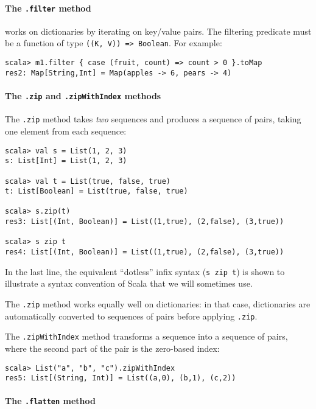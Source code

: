 \paragraph*{The \lstinline!.filter! method }

works on dictionaries by iterating on key/value pairs. The filtering
predicate must be a function of type \lstinline!((K, V)) => Boolean!.
For example:
\begin{lstlisting}
scala> m1.filter { case (fruit, count) => count > 0 }.toMap
res2: Map[String,Int] = Map(apples -> 6, pears -> 4)
\end{lstlisting}


\paragraph*{The \lstinline!.zip! and \lstinline!.zipWithIndex! methods}

The \lstinline!.zip! method takes \emph{two} sequences and produces
a sequence of pairs, taking one element from each sequence:
\begin{lstlisting}
scala> val s = List(1, 2, 3)
s: List[Int] = List(1, 2, 3)

scala> val t = List(true, false, true)
t: List[Boolean] = List(true, false, true)

scala> s.zip(t)
res3: List[(Int, Boolean)] = List((1,true), (2,false), (3,true))

scala> s zip t
res4: List[(Int, Boolean)] = List((1,true), (2,false), (3,true)) 
\end{lstlisting}
In the last line, the equivalent ``dotless'' infix syntax (\lstinline!s zip t!)
is shown to illustrate a syntax convention of Scala that we will sometimes
use.

The \lstinline!.zip! method works equally well on dictionaries: in
that case, dictionaries are automatically converted to sequences of
pairs before applying \lstinline!.zip!.

The \lstinline!.zipWithIndex! method transforms a sequence into a
sequence of pairs, where the second part of the pair is the zero-based
index:
\begin{lstlisting}
scala> List("a", "b", "c").zipWithIndex
res5: List[(String, Int)] = List((a,0), (b,1), (c,2)) 
\end{lstlisting}


\paragraph*{The \lstinline!.flatten! method}

